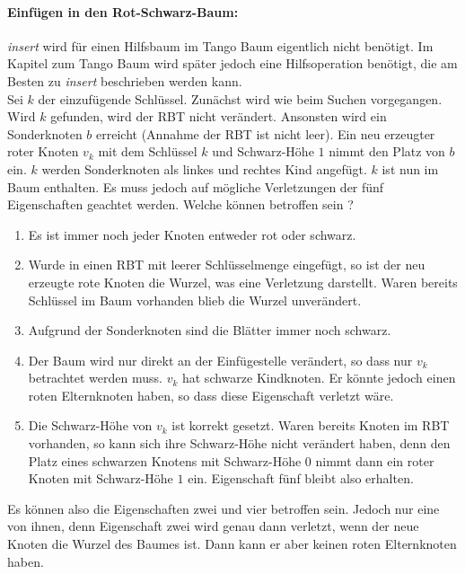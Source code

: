\documentclass[a4paper,12pt]{article}
\begin{document}
\paragraph{Einfügen in den Rot-Schwarz-Baum:}
\textit{insert} wird für einen Hilfsbaum im Tango Baum eigentlich nicht benötigt. Im Kapitel zum Tango Baum wird später jedoch eine Hilfsoperation benötigt, die am Besten zu \textit{insert} beschrieben werden kann.\\
Sei $k$ der einzufügende Schlüssel. Zunächst wird wie beim Suchen vorgegangen. Wird $k$ gefunden, wird der RBT nicht verändert. Ansonsten wird ein Sonderknoten $b$ erreicht (Annahme der RBT ist nicht leer). Ein neu erzeugter roter Knoten $v_k$ mit dem Schlüssel $k$ und Schwarz-Höhe $1$ nimmt den Platz von $b$ ein. $k$ werden Sonderknoten als linkes und rechtes Kind angefügt. $k$ ist nun im Baum enthalten. Es muss jedoch auf mögliche Verletzungen der fünf Eigenschaften geachtet werden. Welche können betroffen sein ?

\begin{enumerate}
	\item Es ist immer noch jeder Knoten entweder rot oder schwarz.
	\item Wurde in einen RBT mit leerer Schlüsselmenge eingefügt, so ist der neu erzeugte rote Knoten die Wurzel, was eine Verletzung darstellt. Waren bereits Schlüssel im Baum vorhanden blieb die Wurzel unverändert.
	\item Aufgrund der Sonderknoten sind die Blätter immer noch schwarz.
	\item Der Baum wird nur direkt an der Einfügestelle verändert, so dass nur $v_k$ betrachtet werden muss. $v_k$ hat schwarze Kindknoten. Er könnte jedoch einen roten Elternknoten haben, so dass diese Eigenschaft verletzt wäre.
	\item Die Schwarz-Höhe von $v_k$ ist korrekt gesetzt. Waren bereits Knoten im RBT vorhanden, so kann sich ihre Schwarz-Höhe nicht verändert haben, denn den Platz eines schwarzen Knotens mit Schwarz-Höhe $0$ nimmt dann ein roter Knoten mit Schwarz-Höhe $1$ ein. Eigenschaft fünf bleibt also erhalten. 
\end{enumerate}  

\noindent Es können also die Eigenschaften zwei und vier betroffen sein. Jedoch nur eine von ihnen, denn Eigenschaft zwei wird genau dann verletzt, wenn der neue Knoten die Wurzel des Baumes ist. Dann kann er aber keinen roten Elternknoten haben.
\end{document}
